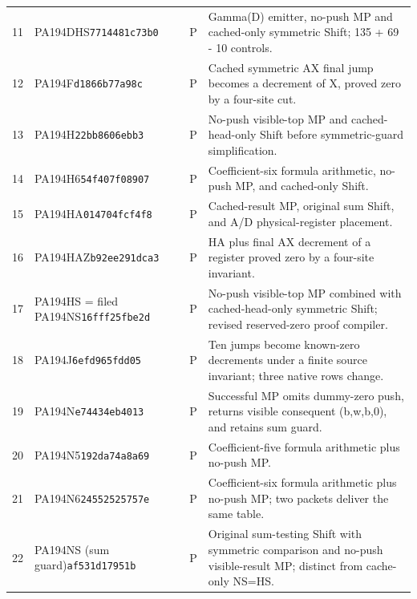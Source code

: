 \begin{longtable}{@{}rp{}cp{}@{}}
11 & PA194DHS\newline\texttt{7714481c73b0} & P & Gamma(D) emitter, no-push MP and cached-only symmetric Shift; 135 + 69 - 10 controls.\\[5pt]
12 & PA194F\newline\texttt{d1866b77a98c} & P & Cached symmetric AX final jump becomes a decrement of X, proved zero by a four-site cut.\\[5pt]
13 & PA194H\newline\texttt{22bb8606ebb3} & P & No-push visible-top MP and cached-head-only Shift before symmetric-guard simplification.\\[5pt]
14 & PA194H6\newline\texttt{54f407f08907} & P & Coefficient-six formula arithmetic, no-push MP, and cached-only Shift.\\[5pt]
15 & PA194HA\newline\texttt{014704fcf4f8} & P & Cached-result MP, original sum Shift, and A/D physical-register placement.\\[5pt]
16 & PA194HAZ\newline\texttt{b92ee291dca3} & P & HA plus final AX decrement of a register proved zero by a four-site invariant.\\[5pt]
17 & PA194HS = filed PA194NS\newline\texttt{16fff25fbe2d} & P & No-push visible-top MP combined with cached-head-only symmetric Shift; revised reserved-zero proof compiler.\\[5pt]
18 & PA194J\newline\texttt{6efd965fdd05} & P & Ten jumps become known-zero decrements under a finite source invariant; three native rows change.\\[5pt]
19 & PA194N\newline\texttt{e74434eb4013} & P & Successful MP omits dummy-zero push, returns visible consequent (b,w,b,0), and retains sum guard.\\[5pt]
20 & PA194N5\newline\texttt{192da74a8a69} & P & Coefficient-five formula arithmetic plus no-push MP.\\[5pt]
21 & PA194N6\newline\texttt{24552525757e} & P & Coefficient-six formula arithmetic plus no-push MP; two packets deliver the same table.\\[5pt]
22 & PA194NS (sum guard)\newline\texttt{af531d17951b} & P & Original sum-testing Shift with symmetric comparison and no-push visible-result MP; distinct from cache-only NS=HS.\\[5pt]

\end{longtable}
